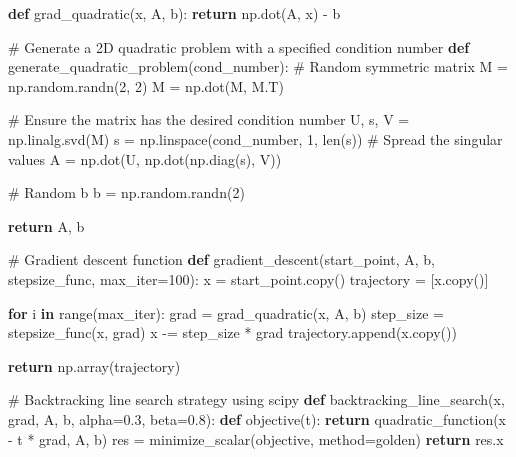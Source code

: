 \documentclass[
  russian,
  letterpaper,
  DIV=11,
  numbers=noendperiod]{scrartcl}
\newenvironment{Shaded}{\begin{snugshade}}{\end{snugshade}}
\newcommand{\BuiltInTok}[1]{\textcolor[rgb]{0.00,0.23,0.31}{#1}}
\newcommand{\CommentTok}[1]{\textcolor[rgb]{0.37,0.37,0.37}{#1}}
\newcommand{\ControlFlowTok}[1]{\textcolor[rgb]{0.00,0.23,0.31}{\textbf{#1}}}
\newcommand{\DecValTok}[1]{\textcolor[rgb]{0.68,0.00,0.00}{#1}}
\newcommand{\FloatTok}[1]{\textcolor[rgb]{0.68,0.00,0.00}{#1}}
\newcommand{\KeywordTok}[1]{\textcolor[rgb]{0.00,0.23,0.31}{\textbf{#1}}}
\newcommand{\NormalTok}[1]{\textcolor[rgb]{0.00,0.23,0.31}{#1}}
\newcommand{\OperatorTok}[1]{\textcolor[rgb]{0.37,0.37,0.37}{#1}}
\newcommand{\StringTok}[1]{\textcolor[rgb]{0.13,0.47,0.30}{#1}}
\begin{document}
\begin{enumerate}
\begin{Shaded}
\begin{Highlighting}[]
\KeywordTok{def}\NormalTok{ grad\_quadratic(x, A, b):}
    \ControlFlowTok{return}\NormalTok{ np.dot(A, x) }\OperatorTok{{-}}\NormalTok{ b}

\CommentTok{\# Generate a 2D quadratic problem with a specified condition number}
\KeywordTok{def}\NormalTok{ generate\_quadratic\_problem(cond\_number):}
    \CommentTok{\# Random symmetric matrix}
\NormalTok{    M }\OperatorTok{=}\NormalTok{ np.random.randn(}\DecValTok{2}\NormalTok{, }\DecValTok{2}\NormalTok{)}
\NormalTok{    M }\OperatorTok{=}\NormalTok{ np.dot(M, M.T)}

    \CommentTok{\# Ensure the matrix has the desired condition number}
\NormalTok{    U, s, V }\OperatorTok{=}\NormalTok{ np.linalg.svd(M)}
\NormalTok{    s }\OperatorTok{=}\NormalTok{ np.linspace(cond\_number, }\DecValTok{1}\NormalTok{, }\BuiltInTok{len}\NormalTok{(s))  }\CommentTok{\# Spread the singular values}
\NormalTok{    A }\OperatorTok{=}\NormalTok{ np.dot(U, np.dot(np.diag(s), V))}

    \CommentTok{\# Random b}
\NormalTok{    b }\OperatorTok{=}\NormalTok{ np.random.randn(}\DecValTok{2}\NormalTok{)}

    \ControlFlowTok{return}\NormalTok{ A, b}

\CommentTok{\# Gradient descent function}
\KeywordTok{def}\NormalTok{ gradient\_descent(start\_point, A, b, stepsize\_func, max\_iter}\OperatorTok{=}\DecValTok{100}\NormalTok{):}
\NormalTok{    x }\OperatorTok{=}\NormalTok{ start\_point.copy()}
\NormalTok{    trajectory }\OperatorTok{=}\NormalTok{ [x.copy()]}

    \ControlFlowTok{for}\NormalTok{ i }\KeywordTok{in} \BuiltInTok{range}\NormalTok{(max\_iter):}
\NormalTok{        grad }\OperatorTok{=}\NormalTok{ grad\_quadratic(x, A, b)}
\NormalTok{        step\_size }\OperatorTok{=}\NormalTok{ stepsize\_func(x, grad)}
\NormalTok{        x }\OperatorTok{{-}=}\NormalTok{ step\_size }\OperatorTok{*}\NormalTok{ grad}
\NormalTok{        trajectory.append(x.copy())}

    \ControlFlowTok{return}\NormalTok{ np.array(trajectory)}

\CommentTok{\# Backtracking line search strategy using scipy}
\KeywordTok{def}\NormalTok{ backtracking\_line\_search(x, grad, A, b, alpha}\OperatorTok{=}\FloatTok{0.3}\NormalTok{, beta}\OperatorTok{=}\FloatTok{0.8}\NormalTok{):}
    \KeywordTok{def}\NormalTok{ objective(t):}
        \ControlFlowTok{return}\NormalTok{ quadratic\_function(x }\OperatorTok{{-}}\NormalTok{ t }\OperatorTok{*}\NormalTok{ grad, A, b)}
\NormalTok{    res }\OperatorTok{=}\NormalTok{ minimize\_scalar(objective, method}\OperatorTok{=}\StringTok{\textquotesingle{}golden\textquotesingle{}}\NormalTok{)}
    \ControlFlowTok{return}\NormalTok{ res.x}


\end{Highlighting}
\end{Shaded}
\end{enumerate}
\end{document}
